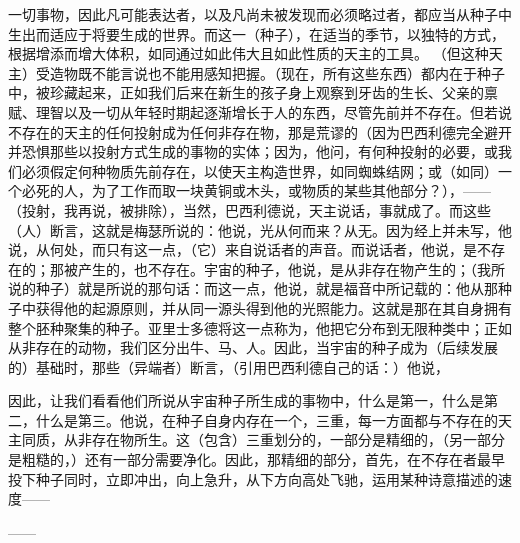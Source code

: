 一切事物，因此凡可能表达者，以及凡尚未被发现而必须略过者，都应当从种子中生出而适应于将要生成的世界。而这一（种子），在适当的季节，以独特的方式，根据增添而增大体积，如同通过如此伟大且如此性质的天主的工具。 （但这种天主）受造物既不能言说也不能用感知把握。（现在，所有这些东西）都内在于种子中，被珍藏起来，正如我们后来在新生的孩子身上观察到牙齿的生长、父亲的禀赋、理智以及一切从年轻时期起逐渐增长于人的东西，尽管先前并不存在。但若说不存在的天主的任何投射成为任何非存在物，那是荒谬的（因为巴西利德完全避开并恐惧那些以投射方式生成的事物的实体；因为，他问，有何种投射的必要，或我们必须假定何种物质先前存在，以使天主构造世界，如同蜘蛛结网；或（如同）一个必死的人，为了工作而取一块黄铜或木头，或物质的某些其他部分？），——（投射，我再说，被排除），当然，巴西利德说，天主说话，事就成了。而这些（人）断言，这就是梅瑟所说的：他说，光从何而来？从无。因为经上并未写，他说，从何处，而只有这一点，（它）来自说话者的声音。而说话者，他说，是不存在的；那被产生的，也不存在。宇宙的种子，他说，是从非存在物产生的；（我所说的种子）就是所说的那句话：而这一点，他说，就是福音中所记载的：他从那种子中获得他的起源原则，并从同一源头得到他的光照能力。这就是那在其自身拥有整个胚种聚集的种子。亚里士多德将这一点称为，他把它分布到无限种类中；正如从非存在的动物，我们区分出牛、马、人。因此，当宇宙的种子成为（后续发展的）基础时，那些（异端者）断言，（引用巴西利德自己的话：）他说，\par

因此，让我们看看他们所说从宇宙种子所生成的事物中，什么是第一，什么是第二，什么是第三。他说，在种子自身内存在一个，三重，每一方面都与不存在的天主同质，从非存在物所生。这（包含）三重划分的，一部分是精细的，（另一部分是粗糙的，）还有一部分需要净化。因此，那精细的部分，首先，在不存在者最早投下种子同时，立即冲出，向上急升，从下方向高处飞驰，运用某种诗意描述的速度——\par

——\par

